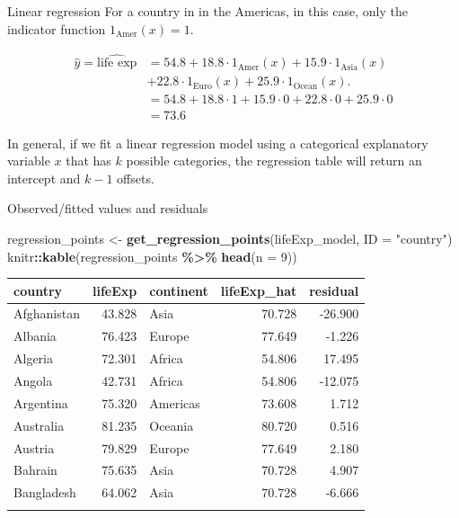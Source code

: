 \documentclass[
  ignorenonframetext,
]{beamer}
\newenvironment{Shaded}{\begin{snugshade}}{\end{snugshade}}
\newcommand{\AttributeTok}[1]{\textcolor[rgb]{0.13,0.29,0.53}{#1}}
\newcommand{\DecValTok}[1]{\textcolor[rgb]{0.00,0.00,0.81}{#1}}
\newcommand{\FunctionTok}[1]{\textcolor[rgb]{0.13,0.29,0.53}{\textbf{#1}}}
\newcommand{\NormalTok}[1]{#1}
\newcommand{\OtherTok}[1]{\textcolor[rgb]{0.56,0.35,0.01}{#1}}
\newcommand{\SpecialCharTok}[1]{\textcolor[rgb]{0.81,0.36,0.00}{\textbf{#1}}}
\newcommand{\StringTok}[1]{\textcolor[rgb]{0.31,0.60,0.02}{#1}}
\begin{document}
\begin{frame}{Linear regression}
\protect\hypertarget{linear-regression-5}{}
For a country in in the Americas, in this case, only the indicator
function \(1_{\text{Amer}}(x)=1\).

\[\begin{array}{ll}
\hat{y}=\widehat{\text{life exp}}&=54.8+18.8\cdot1_{\text{Amer}}(x)+15.9\cdot 1_{\text{Asia}}(x)\\
&+22.8\cdot 1_{\text{Euro}}(x)+25.9\cdot 1_{\text{Ocean}}(x).\\
&=54.8+18.8\cdot1+15.9\cdot 0+22.8\cdot 0+25.9\cdot 0\\
&=73.6
\end{array}\]

In general, if we fit a linear regression model using a categorical
explanatory variable \(x\) that has \(k\) possible categories, the
regression table will return an intercept and \(k-1\) offsets.
\end{frame}

\begin{frame}[fragile]{Observed/fitted values and residuals}
\protect\hypertarget{observedfitted-values-and-residuals}{}
\normalsize

\begin{Shaded}
\begin{Highlighting}[]
\NormalTok{regression\_points }\OtherTok{\textless{}{-}} \FunctionTok{get\_regression\_points}\NormalTok{(lifeExp\_model, }
                                           \AttributeTok{ID =} \StringTok{"country"}\NormalTok{) }
\NormalTok{knitr}\SpecialCharTok{::}\FunctionTok{kable}\NormalTok{(regression\_points }\SpecialCharTok{\%\textgreater{}\%} \FunctionTok{head}\NormalTok{(}\AttributeTok{n =} \DecValTok{9}\NormalTok{))}
\end{Highlighting}
\end{Shaded}

\begin{longtable}[]{@{}lrlrr@{}}
\toprule\noalign{}
country & lifeExp & continent & lifeExp\_hat & residual \\
\midrule\noalign{}
\endhead
Afghanistan & 43.828 & Asia & 70.728 & -26.900 \\
Albania & 76.423 & Europe & 77.649 & -1.226 \\
Algeria & 72.301 & Africa & 54.806 & 17.495 \\
Angola & 42.731 & Africa & 54.806 & -12.075 \\
Argentina & 75.320 & Americas & 73.608 & 1.712 \\
Australia & 81.235 & Oceania & 80.720 & 0.516 \\
Austria & 79.829 & Europe & 77.649 & 2.180 \\
Bahrain & 75.635 & Asia & 70.728 & 4.907 \\
Bangladesh & 64.062 & Asia & 70.728 & -6.666 \\
\bottomrule\noalign{}
\end{longtable}

\normalsize
\end{frame}
\end{document}
